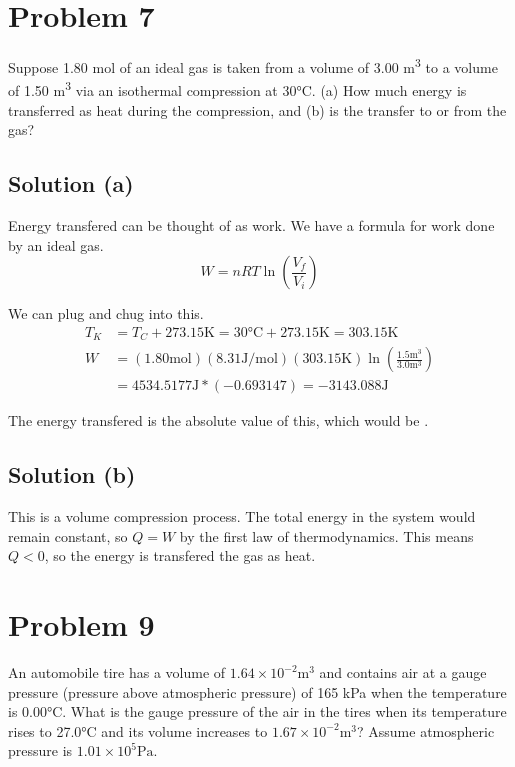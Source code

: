 \documentclass[12pt]{article}
\begin{document}
    \pagebreak
    \section{Problem 7}
        Suppose 1.80 mol of an ideal gas is taken from a volume of 3.00 \unit{\meter^3} to a volume of 1.50 \unit{\meter^3} via an isothermal compression at 30\unit{\celsius}. 
        (a) How much energy is transferred as heat during the compression, and (b) is the transfer to or from the gas?

        \subsection{Solution (a)}
            Energy transfered can be thought of as work. 
            We have a formula for work done by an ideal gas.
            \begin{equation}
                W   =   nRT \ln\left( \frac{V_f}{V_i} \right)
            \end{equation}

            We can plug and chug into this.
            \begin{align}
                T_K &=  T_C + 273.15 \unit{\kelvin}
                    =   30 \unit{\celsius} + 273.15 \unit{\kelvin}
                    =   303.15 \unit{\kelvin}\\
                W   &=  (1.80 \unit{\mole}) (8.31 \unit{\joule/\mole}) (303.15 \unit{\kelvin}) \ln\left( \frac{1.5 \unit{\meter^3}}{3.0 \unit{\meter^3}} \right)\\
                    &=  4534.5177 \unit{\joule} * (-0.693147)
                    =   -3143.088 \unit{\joule}
            \end{align}

            The energy transfered is the absolute value of this, which would be \boxed{3143.088 \unit{\joule}}. 

        \subsection{Solution (b)}
            This is a volume compression process.
            The total energy in the system would remain constant, so $Q = W$ by the first law of thermodynamics.
            This means $Q < 0$, so the energy is transfered  the gas as heat.

    \pagebreak
    \section{Problem 9}
        An automobile tire has a volume of $1.64 \times 10^{-2} \unit{\meter^3}$ and contains air at a gauge pressure (pressure above atmospheric pressure) of 165 kPa when the temperature is 0.00\unit{\celsius}. 
        What is the gauge pressure of the air in the tires when its temperature rises to 27.0\unit{\celsius} and its volume increases to $1.67 \times 10^{-2} \unit{\meter^3}$? 
        Assume atmospheric pressure is $1.01 \times 10^5 \unit{\pascal}$.
\end{document}
